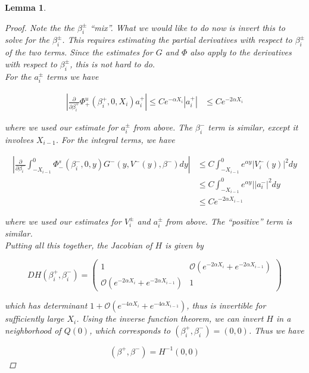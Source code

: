 \documentclass[12pt]{article}
\newtheorem{lemma}{Lemma}
\begin{document}
\begin{lemma}
\begin{proof}
Note the the $\beta_i^\pm$ ``mix''. What we would like to do now is invert this to solve for the $\beta_i^\pm$. This requires estimating the partial derivatives with respect to $\beta_i^\pm$ of the two terms. Since the estimates for $G$ and $\Phi$ also apply to the derivatives with respect to $\beta_i^\pm$, this is not hard to do.\\

For the $a_i^\pm$ terms we have

\begin{align*}
\left| \frac{\partial}{\partial \beta_i^+} \Phi^u_+(\beta_i^+, 0, X_i) a_i^+ \right| \leq C e^{-\alpha X_i}|a_i^+|
& \leq C e^{-2 \alpha X_i}
\end{align*}

where we used our estimate for $a_i^\pm$ from above. The $\beta_i^-$ term is similar, except it involves $X_{i-1}$. For the integral terms, we have

\begin{align*}
\left| \frac{\partial}{\partial \beta_i^-} \int_{-X_{i-1}}^0 \Phi_-^s(\beta_i^-, 0, y) G^-(y, V^-(y),\beta^-)dy \right| 
&\leq C \int_{-X_{i-1}}^0 e^{\alpha y} | V_i^-(y) |^2 dy \\
&\leq C \int_{-X_{i-1}}^0 e^{\alpha y} | |a_i^-|^2 dy \\
&\leq C e^{-2 \alpha X_{i-1}}
\end{align*}

where we used our estimates for $V_i^\pm$ and $a_i^\pm$ from above. The ``positive'' term is similar. \\

Putting all this together, the Jacobian of $H$ is given by

\begin{equation}
D H(\beta_i^+, \beta_i^-) = 
\begin{pmatrix}
1 & \mathcal{O}(e^{-2 \alpha X_i} + e^{-2 \alpha X_{i-1}} ) \\
\mathcal{O}(e^{-2 \alpha X_i} + e^{-2 \alpha X_{i-1}} ) &  1 
\end{pmatrix}
\end{equation}

which has determinant $1 + \mathcal{O}(e^{-4 \alpha X_i} + e^{-4 \alpha X_{i-1}})$, thus is invertible for sufficiently large $X_i$. Using the inverse function theorem, we can invert $H$ in a neighborhood of $Q(0)$, which corresponds to $(\beta_i^+, \beta_i^-) = (0, 0)$. Thus we have 

\[
(\beta^+, \beta^-) = H^{-1}(0, 0)
\]


\end{proof}
\end{lemma}
\end{document}
